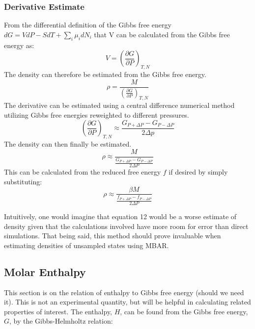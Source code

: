 \documentclass[aps,pre,twocolumn,nofootinbib,superscriptaddress,linenumbers,10pt, draft,tightenlines]{revtex4-1}
\begin{document}
\subsubsection{Derivative Estimate}
 From the differential definition of the Gibbs free energy $dG = VdP -SdT + \sum_i \mu_i dN_i$ that V can be calculated from the Gibbs free energy as:
\begin{equation} V = \left( \frac{\partial G}{\partial P} \right)_{T,N} \end{equation}
 The density can therefore be estimated from the Gibbs free energy.
\begin{equation} \rho = \frac{M}{ \left( \frac{\partial G}{\partial P} \right)_{T,N}} \end{equation}
 The derivative can be estimated using a central difference numerical method utilizing Gibbs free energies reweighted to different pressures.
\begin{equation} \left( \frac{\partial G}{\partial P} \right)_{T,N} \approx \frac{G_{P + \Delta P} - G_{P-\Delta P}}{2\Delta p} \end{equation}
 The density can then finally be estimated.
\begin{equation} \rho \approx \frac{M}{\frac{G_{P + \Delta P} - G_{P-\Delta P}}{2\Delta P}} \end{equation}
This can be calculated from the reduced free energy $f$ if desired by simply substituting:
\begin{equation} \rho \approx \frac{\beta M}{\frac{f_{P + \Delta P} - f_{P-\Delta P}}{2\Delta P}} \end{equation}

Intuitively, one would imagine that equation 12 would be a worse estimate of density given that the calculations involved have more room for error than direct simulations. That being said, this method should prove invaluable when estimating densities of unsampled states using MBAR. 

\subsection{Molar Enthalpy}
This section is on the relation of enthalpy to Gibbs free energy (should we need it). This is not an experimental quantity, but will be helpful in calculating related properties of interest. The enthalpy, $H$, can be found from the Gibbs free energy, $G$, by the Gibbs-Helmholtz relation: 
\end{document}
